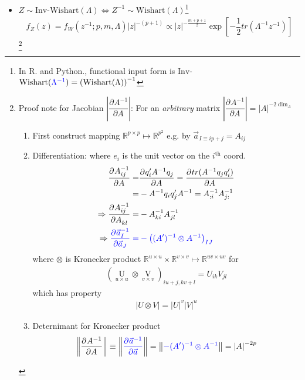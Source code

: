 \begin{itemize}[topsep=2pt,itemsep=0pt]
\begin{itemize}[topsep=2pt,itemsep=0pt]
        \item $ Z\sim \mathrm{Inv}  $-$ \mathrm{Wishart}(\Lambda )\Leftrightarrow Z^{-1}\sim \mathrm{Wishart}(\Lambda )   $\footnote{In R. and Python., functional input form is $\mathrm{Inv}$-$ \mathrm{Wishart}({\color{blue}\Lambda^{-1}} )=\left(\mathrm{Wishart}(\Lambda ) \right)^{-1}  $}
        \begin{align}
            f_Z(z)= f_W(z^{-1};p,m,\Lambda )\left|z\right|^{-(p+1)} \propto |z|^{-\frac{m+p+1}{2}}\exp\left[ -\dfrac{1}{2}tr(\Lambda ^{-1}z^{-1}) \right]
        \end{align}
        \footnote{Proof note for Jacobian $ \left|\dfrac{\partial^{}A^{-1}}{\partial A^{}}\right| $: For an \textit{arbitrary} matrix $ \left|\dfrac{\partial^{}A^{-1}}{\partial A^{}}\right| = |A|^{-2\dim_A}$
        \begin{enumerate}[topsep=2pt,itemsep=0pt]
            \item First construct mapping $ \mathbb{R}^{p\times p}\mapsto \mathbb{R}^{p^2} $ e.g. by $ \vec{a}_{I\equiv ip+j}=A_{ij} $
            \item Differentiation: where $ e_i $ is the unit vector on the $ i^\mathrm{th}  $ coord.
            \begin{align}
                \dfrac{\partial^{} A^{-1}_{ij}}{\partial A ^{}} =& \dfrac{\partial^{} q_i'A^{-1}q_j}{\partial A^{}}= \dfrac{\partial^{} tr(A^{-1}q_jq_i')}{\partial A^{}}\\
                =&-A^{-1}q_iq_j'A^{-1}=A^{-1}_{:i}A^{-1}_{j:}\\
                \Rightarrow \dfrac{\partial^{} A^{-1}_{ij}}{\partial A_{kl} ^{}}=&-A^{-1}_{ki}A^{-1}_{jl}\\
                \Rightarrow \color{blue}\dfrac{\partial^{} \vec{a}^{-1}_I}{\partial\vec{a}_J}=&\color{blue}-\left( (A')^{-1}\otimes A^{-1} \right)_{IJ}
            \end{align}
            where $ \otimes $ is Kronecker product $ \mathbb{R}^{u\times u}\times \mathbb{R}^{v\times v}\mapsto \mathbb{R}^{uv\times uv} $ for 
            \begin{align}
                (\mathop{U}\limits_{u\times u} \otimes \mathop{V}\limits_{v\times v} )_{iu+j,kv+l}=U_{ik}V_{jl} 
            \end{align}
            which has property
            \begin{align}
                 \left|U\otimes V\right|=\left|U\right|^{v}\left|V \right|^{u}
            \end{align}
            \item Deternimant for Kronecker product
            \begin{align}
                \left\Vert\dfrac{\partial^{} A^{-1}}{\partial A^{}}\right\Vert\equiv \left\Vert{\color{blue} \dfrac{\partial^{} \vec{a}^{-1}}{\partial \vec{a}}}\right\Vert = \left\Vert {\color{blue}-(A')^{-1}\otimes A^{-1} }\right\Vert=\left|A\right|^{-2p}
            \end{align}
        \end{enumerate}

}
\end{itemize}
\end{itemize}
